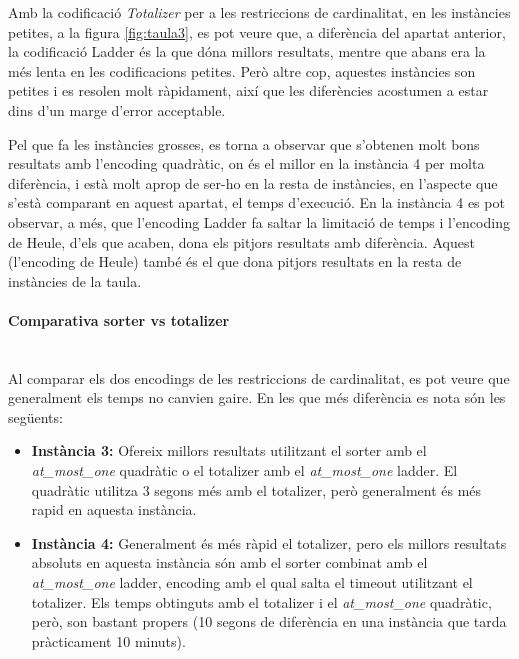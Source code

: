 \documentclass[11pt,a4paper,twoside]{report}
\begin{document}
  Amb la codificació \textit{Totalizer} per a les restriccions de cardinalitat, en les instàncies petites, a la figura \ref{fig:taula3}, 
  es pot veure que, a diferència del apartat anterior, la codificació Ladder és la que dóna millors resultats, mentre que abans era la més lenta en les codificacions petites. Però altre cop, aquestes instàncies son petites i es resolen molt ràpidament, 
  així que les diferències acostumen a estar dins d'un marge d'error acceptable. 

  Pel que fa les instàncies grosses, es torna a observar que s'obtenen molt bons resultats amb l'encoding quadràtic, on és el millor en la instància 4 per molta diferència, i està molt aprop de ser-ho en la resta de instàncies, 
  en l'aspecte que s'està comparant en aquest apartat, el temps d'execució.
  En la instància 4 es pot observar, a més, que l'encoding Ladder fa saltar la limitació de temps i l'encoding de Heule, d'els que acaben, dona els pitjors resultats amb diferència. 
  Aquest (l'encoding de Heule) també és el que dona pitjors resultats en la resta de instàncies de la taula.




  \paragraph*{Comparativa sorter vs totalizer} ~\\

  Al comparar els dos encodings de les restriccions de cardinalitat, es pot veure que generalment els temps no canvien gaire. En les que més diferència es nota són les següents:
  \begin{itemize}
    \item \textbf{Instància 3: }Ofereix millors resultats utilitzant el sorter amb el \textit{at\_most\_one} quadràtic o el totalizer amb el \textit{at\_most\_one} ladder. El quadràtic utilitza 3 segons més amb el totalizer, però generalment és més rapid en aquesta instància.
    \item \textbf{Instància 4: }Generalment és més ràpid el totalizer, pero els millors resultats absoluts en aquesta instància són amb el sorter combinat amb el \textit{at\_most\_one} ladder, 
    encoding amb el qual salta el timeout utilitzant el totalizer. Els temps obtinguts amb el totalizer i el  \textit{at\_most\_one} quadràtic, però, son bastant propers (10 segons de diferència en una instància que tarda pràcticament 10 minuts). 
  \end{itemize}
\end{document}
